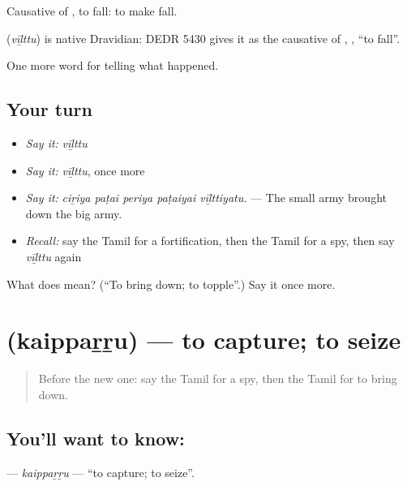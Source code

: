 Causative of , to fall: to make fall.

\begin{cousinweb}
\textbf{} (\emph{vīḻttu}) is native Dravidian: DEDR 5430 gives it as the causative of , , \textquotedblleft{}to fall\textquotedblright{}.
\end{cousinweb}

\begin{grammarlens}[title={What you've built}]
One more word for telling what happened.
\end{grammarlens}

\subsection*{Your turn}
\begin{itemize}
\raggedright
  \item \emph{Say it:} \emph{vīḻttu}
  \item \emph{Say it:} \emph{vīḻttu}, once more
  \item \emph{Say it:} \emph{ciṟiya paṭai periya paṭaiyai vīḻttiyatu.} — The small army brought down the big army.
  \item \emph{Recall:} say the Tamil for a fortification, then the Tamil for a spy, then say \emph{vīḻttu} again
\end{itemize}

\begin{tcolorbox}[breakable,colback=teal!4,colframe=teal!35!black,title={Before you move on}]
What does  mean? (\textquotedblleft{}To bring down; to topple\textquotedblright{}.) Say it once more.
\end{tcolorbox}
\section[\texorpdfstring{\ta{கைப்பற்று} (kaippaṟṟu)}{கைப்பற்று (kaippaṟṟu)}]{ (kaippaṟṟu) — to capture; to seize}

\label{lesson:TA-C336-kaipparru}



\begin{quote}
Before the new one: say the Tamil for a spy, then the Tamil for to bring down.
\end{quote}

\subsection*{You'll want to know: }
\textbf{} — \emph{kaippaṟṟu} — \textquotedblleft{}to capture; to seize\textquotedblright{}.

